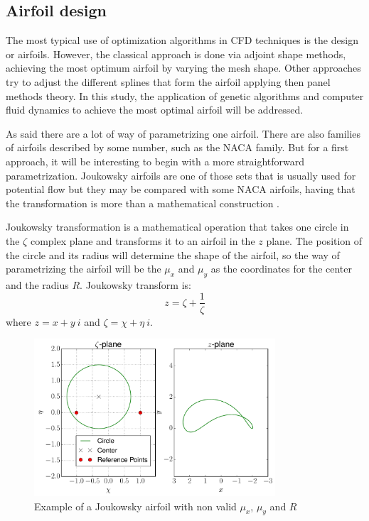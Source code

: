 \vspace{2mm}

\newpage

\subsection{Airfoil design}


The most typical use of optimization algorithms in CFD techniques is the design or airfoils. However, the classical approach is done via adjoint shape methods, achieving the most optimum airfoil by varying the mesh shape. Other approaches try to adjust the different splines that form the airfoil applying then panel methods theory. In this study, the application of genetic algorithms and computer fluid dynamics to achieve the most optimal airfoil will be addressed. 

As said there are a lot of way of parametrizing one airfoil. There are also families of airfoils described by some number, such as the NACA family. But for a first approach, it will be interesting to begin with a more straightforward parametrization. Joukowsky airfoils are one of those sets that is usually used for potential flow but they may be compared with some NACA airfoils, having that the transformation is more than a mathematical construction \cite{kapania2008modeling}.

Joukowsky transformation is a mathematical operation that takes one circle in the $\zeta$ complex plane and transforms it to an airfoil in the $z$ plane. The position of the circle and its radius will determine the shape of the airfoil, so the way of parametrizing the airfoil will be the $\mu_x$ and $\mu_y$ as the coordinates for the center and the radius $R$. Joukowsky transform is:
\begin{equation}
z=\zeta+\dfrac{1}{\zeta}
\end{equation}
where $z = x + y\ i$ and $\zeta = \chi + \eta\ i$. 

     \begin{figure}[h!]
        \centering
        \includegraphics[width=0.8\textwidth]{Figures/3/nonJouk2.pdf}
        \caption{Example of a Joukowsky airfoil with non valid $\mu_x$, $\mu_y$ and $R$}
        \label{fig:nonJoukowsky}
    \end{figure}

